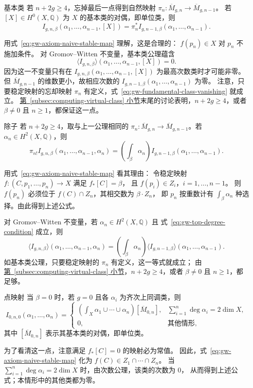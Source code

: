 \begin{axiom*}{基本类}
若 $n+2g\geq4$，忘掉最后一点得到自然映射
$\pi_n:\overline M_{g,n}\to\overline M_{g,n-1}$。
若 $[X]\in H^0(X,\mathbb Q)$ 为 $X$ 的基本类的对偶，即单位类，则
\[
I_{g,n,\beta}(\alpha_1,\ldots,\alpha_{n-1},[X])
=\pi_n^*I_{g,n-1,\beta}(\alpha_1,\ldots,\alpha_{n-1}).
\]
\end{axiom*}
用式~\eqref{eq:gw-axiom-naive-stable-map} 理解，这是合理的：
$f(p_n)\in X$ 对 $p_n$ 不施加条件。
对 Gromov--Witten 不变量，基本类公理蕴含
\begin{equation}\label{eq:gw-fundamental-class-vanishing}
\langle I_{g,n,\beta}\rangle(\alpha_1,\ldots,\alpha_{n-1},[X])=0.
\end{equation}
因为这一不变量只有在
$I_{g,n,\beta}(\alpha_1,\ldots,\alpha_{n-1},[X])$ 为最高次数类时才可能非零。
但 $\overline M_{g,n-1}$ 的维数更小，故相应次数的
$I_{g,n-1,\beta}(\alpha_1,\ldots,\alpha_{n-1})$ 为零。
注意，只要稳定映射的忘却映射 $\pi_n$ 有定义，式~\eqref{eq:gw-fundamental-class-vanishing} 就成立。
\hyperref[subsec:computing-virtual-class]{第~\ref*{subsec:computing-virtual-class} 小节}末尾的讨论表明，$n+2g\geq4$，或者 $\beta\ne0$ 且 $n\geq1$，都保证这一点。

\begin{axiom*}{除子}
若 $n+2g\geq4$，取与上一公理相同的
$\pi_n:\overline M_{g,n}\to\overline M_{g,n-1}$。若 $\alpha_n\in H^2(X,\mathbb Q)$，则
\[
\pi_{n!}I_{g,n,\beta}(\alpha_1,\ldots,\alpha_{n-1},\alpha_n)
=\left(\int_\beta\alpha_n\right)
I_{g,n-1,\beta}(\alpha_1,\ldots,\alpha_{n-1}).
\]
\end{axiom*}
用式~\eqref{eq:gw-axiom-naive-stable-map} 看其理由：
令稳定映射 $f:(C,p_1,\ldots,p_n)\to X$ 满足 $f_*[C]=\beta$，
且 $f(p_i)\in Z_i$，$i=1,\ldots,n-1$。
则 $f(p_n)$ 必须位于 $f(C)\cap Z_n$，其相交数为 $\beta\cdot Z_n$，
即 $p_n$ 按重数计有 $\int_\beta\alpha_n$ 种选择。由此得到上述公式。

对 Gromov--Witten 不变量，若 $\alpha_n\in H^2(X,\mathbb Q)$ 且
式~\eqref{eq:gw-top-degree-condition} 成立，则
\[
\langle I_{g,n,\beta}\rangle(\alpha_1,\ldots,\alpha_{n-1},\alpha_n)
=\left(\int_\beta\alpha_n\right)
\langle I_{g,n-1,\beta}\rangle(\alpha_1,\ldots,\alpha_{n-1}).
\]
如基本类公理，只要稳定映射的 $\pi_n$ 有定义，这一等式就成立；
由\hyperref[subsec:computing-virtual-class]{第~\ref*{subsec:computing-virtual-class} 小节}，$n+2g\geq4$，或者 $\beta\ne0$ 且 $n\geq1$，都足够。

\begin{axiom*}{点映射}
当 $\beta=0$ 时，若 $g=0$ 且各 $\alpha_i$ 为齐次上同调类，则
\[
I_{0,n,0}(\alpha_1,\ldots,\alpha_n)=
\begin{cases}
\displaystyle\left(\int_X\alpha_1\cup\cdots\cup\alpha_n\right)
[\overline M_{0,n}],&\displaystyle\sum_{i=1}^n\deg\alpha_i=2\dim X,\\
0,&\text{其他情形},
\end{cases}
\]
其中 $[\overline M_{0,n}]$ 表示其基本类的对偶，即单位类。
\end{axiom*}
为了看清这一点，注意满足 $f_*[C]=0$ 的映射必为常值。
因此，式~\eqref{eq:gw-axiom-naive-stable-map} 化为 $f(C)\in Z_1\cap\cdots\cap Z_n$。
当 $\sum_{i=1}^n\deg\alpha_i=2\dim X$ 时，由次数公理，该类的次数为 $0$，
从而得到上述公式；本情形中的其他类都为零。

